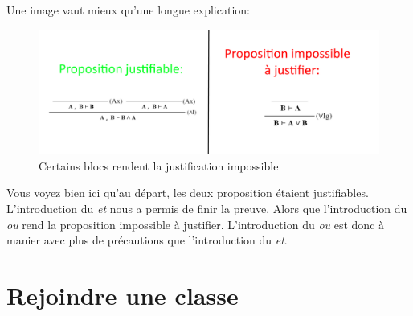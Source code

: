 \documentclass[a4paper]{article}
\begin{document}
Une image vaut mieux qu'une longue explication:
\begin{figure}[h!]
\begin{center}
\includegraphics[scale=0.3]{schema1.png}
\end{center}
\caption{Certains blocs rendent la justification impossible}\label{im:blocs_et_ou}
\end{figure}
\FloatBarrier
Vous voyez bien ici qu'au départ, les deux proposition étaient justifiables.
L'introduction du \textit{et} nous a permis de finir la preuve.
Alors que l'introduction du \textit{ou} rend la proposition impossible à justifier.
L'introduction du \textit{ou} est donc à manier avec plus de précautions que l’introduction du \textit{et}.



\section{Rejoindre une classe}
\end{document}
